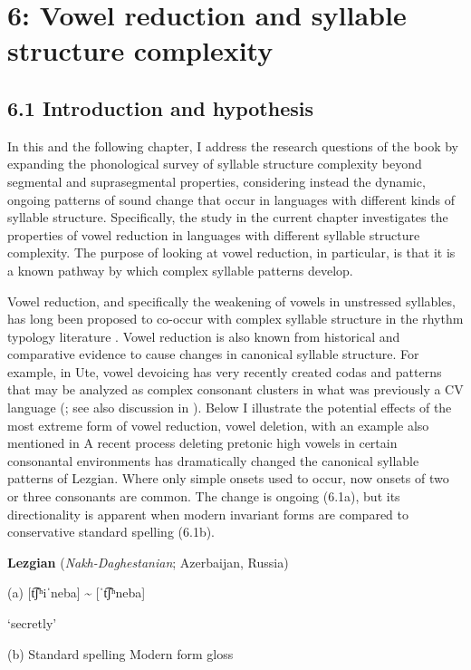 \chapter{6: Vowel reduction and syllable structure complexity}
\section{6.1 Introduction and hypothesis}

  In this and the following chapter, I address the research questions of the book by expanding the phonological survey of syllable structure complexity beyond segmental and suprasegmental properties, considering instead the dynamic, ongoing patterns of sound change that occur in languages with different kinds of syllable structure. Specifically, the study in the current chapter investigates the properties of vowel reduction in languages with different syllable structure complexity. The purpose of looking at vowel reduction, in particular, is that it is a known pathway by which complex syllable patterns develop.

  Vowel reduction, and specifically the weakening of vowels in unstressed syllables, has long been proposed to co-occur with complex syllable structure in the rhythm typology literature \citep{Auer1993}. Vowel reduction is also known from historical and comparative evidence to cause changes in canonical syllable structure. For example, in Ute, vowel devoicing has very recently created codas and patterns that may be analyzed as complex consonant clusters in what was previously a CV language (\citealt{Givón2011}; see also discussion in ). Below I illustrate the potential effects of the most extreme form of vowel reduction, vowel deletion, with an example also mentioned in  A recent process deleting pretonic high vowels in certain consonantal environments has dramatically changed the canonical syllable patterns of Lezgian. Where only simple onsets used to occur, now onsets of two or three consonants are common. The change is ongoing (6.1a), but its directionality is apparent when modern invariant forms are compared to conservative standard spelling (6.1b).

\ea\label{ex:(6.1)}
  \textbf{Lezgian} (\textit{Nakh-Daghestanian}; Azerbaijan, Russia)

(a)  [t͡ʃʰiˈneba] {\textasciitilde} [ˈt͡ʃʰneba]

‘secretly’

(b)  Standard spelling  Modern form    gloss

